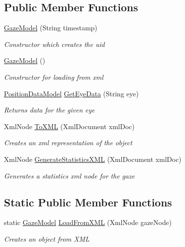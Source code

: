 \subsection*{Public Member Functions}
\begin{DoxyCompactItemize}
\item 
\hyperlink{class_web_analyzer_1_1_models_1_1_data_model_1_1_gaze_model_a66f9cf33a64b7fc07aba8203be3a481c}{Gaze\+Model} (String timestamp)
\begin{DoxyCompactList}\small\item\em Constructor which creates the uid \end{DoxyCompactList}\item 
\hyperlink{class_web_analyzer_1_1_models_1_1_data_model_1_1_gaze_model_a711f713288d82f87ee51b760d93e8cd6}{Gaze\+Model} ()
\begin{DoxyCompactList}\small\item\em Constructor for loading from xml \end{DoxyCompactList}\item 
\hyperlink{class_web_analyzer_1_1_models_1_1_data_model_1_1_position_data_model}{Position\+Data\+Model} \hyperlink{class_web_analyzer_1_1_models_1_1_data_model_1_1_gaze_model_a0bde3b1a59828e2bc8680917872a89b1}{Get\+Eye\+Data} (String eye)
\begin{DoxyCompactList}\small\item\em Returns data for the given eye \end{DoxyCompactList}\item 
Xml\+Node \hyperlink{class_web_analyzer_1_1_models_1_1_data_model_1_1_gaze_model_a0b04be81bba52c2b204aade39f0e945b}{To\+X\+M\+L} (Xml\+Document xml\+Doc)
\begin{DoxyCompactList}\small\item\em Creates an xml representation of the object \end{DoxyCompactList}\item 
Xml\+Node \hyperlink{class_web_analyzer_1_1_models_1_1_data_model_1_1_gaze_model_a376ad99abf5742a4086e891a755a551c}{Generate\+Statistics\+X\+M\+L} (Xml\+Document xml\+Doc)
\begin{DoxyCompactList}\small\item\em Generates a statistics xml node for the gaze \end{DoxyCompactList}\end{DoxyCompactItemize}
\subsection*{Static Public Member Functions}
\begin{DoxyCompactItemize}
\item 
static \hyperlink{class_web_analyzer_1_1_models_1_1_data_model_1_1_gaze_model}{Gaze\+Model} \hyperlink{class_web_analyzer_1_1_models_1_1_data_model_1_1_gaze_model_af6ae5c749db932c888009e906ea457d5}{Load\+From\+X\+M\+L} (Xml\+Node gaze\+Node)
\begin{DoxyCompactList}\small\item\em Creates an object from X\+M\+L \end{DoxyCompactList}\end{DoxyCompactItemize}
